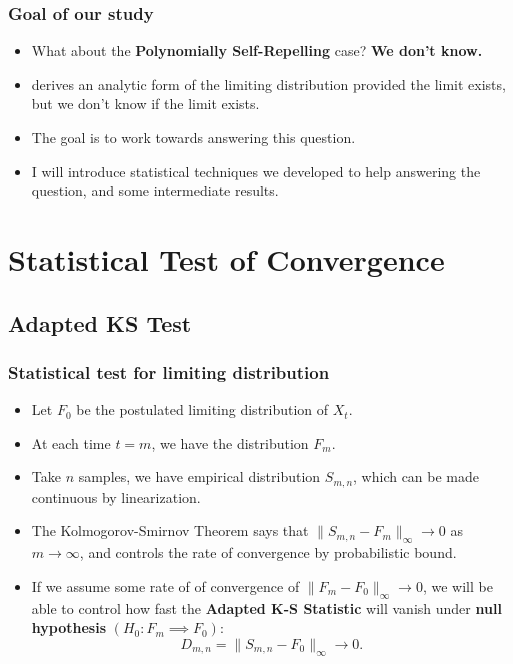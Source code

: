 \documentclass{beamer}
\begin{document}
\begin{frame}
	\frametitle{Goal of our study}
	\begin{itemize}
		\item 
	What about the \textbf{Polynomially Self-Repelling} case? {\color{red}\textbf{We don't know.}}
\item<2->
	\cite{tothGeneralizedRayKnightTheory1996} derives an analytic form of the limiting distribution provided the limit exists, but we don't know if the limit exists.
\item <3->
	The goal is to work towards answering this question.
\item <3->
	I will introduce statistical techniques we developed to help answering the question, and some intermediate results.
	\end{itemize}




\end{frame}

\section{Statistical Test of Convergence}
\subsection*{Adapted KS Test}

\begin{frame}
	\frametitle{Statistical test for limiting distribution}

	\begin{itemize}
		\item Let $F_0$ be the postulated limiting distribution of  $X_t$.
		\item At each time $t = m$, we have the distribution $F_m$.
		\item<2-> Take $n$ samples, we have empirical distribution $S_{m, n}$, which can be made continuous by linearization.
		\item<3-> The Kolmogorov-Smirnov Theorem says that $\|S_{m, n} - F_m\|_{\infty } \to  0$ as $m \to  \infty $, and controls the rate of convergence by probabilistic bound.
		\item<4-> If we assume some rate of of convergence of $\|F_m - F_0\|_{\infty }\to 0$, we will be able to control how fast the \textbf{Adapted K-S Statistic} will vanish under \textbf{null hypothesis} $(H_0: F_m \implies F_0)$:
			\[
				D_{m,n} = \|S_{m, n}- F_0\|_{\infty } \to  0
			.\] 
	\end{itemize}
\end{frame}
\end{document}
